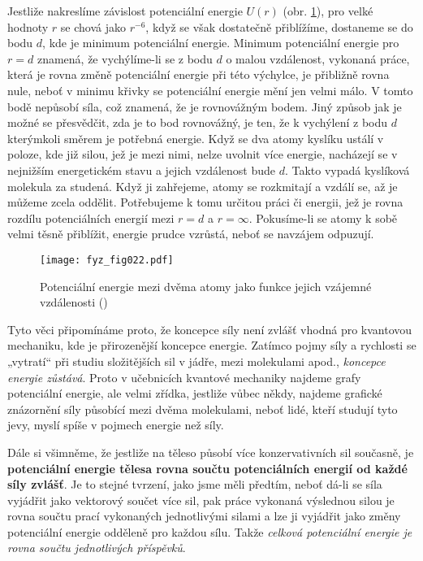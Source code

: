     Jestliže nakreslíme závislost potenciální energie \(U(r)\) (obr. \ref{fyz:fig022}), pro velké 
    hodnoty \(r\) se chová jako \(r^{-6}\), když se však dostatečně přiblížíme, dostaneme se do 
    bodu \(d\), kde je minimum potenciální energie. Minimum potenciální energie pro \(r=d\) 
    znamená, že vychýlíme-li se z bodu \(d\) o malou vzdálenost, vykonaná práce, která je rovna 
    změně potenciální energie při této výchylce, je přibližně rovna nule, neboť v minimu křivky se 
    potenciální energie mění jen velmi málo. V tomto bodě nepůsobí síla, což znamená, že je 
    rovnovážným bodem. Jiný způsob jak je možné se přesvědčit, zda je to bod rovnovážný, je ten, že 
    k vychýlení z bodu \(d\) kterýmkoli směrem je potřebná energie. Když se dva atomy kyslíku 
    ustálí v poloze, kde již silou, jež je mezi nimi, nelze uvolnit více energie, nacházejí se v 
    nejnižším energetickém stavu a jejich vzdálenost bude \(d\). Takto vypadá kyslíková molekula za 
    studená. Když ji zahřejeme, atomy se rozkmitají a vzdálí se, až je můžeme zcela oddělit. 
    Potřebujeme k tomu určitou práci či energii, jež je rovna rozdílu potenciálních energií mezi 
    \(r = d\) a \(r=\infty\). Pokusíme-li se atomy k sobě velmi těsně přiblížit, energie prudce 
    vzrůstá, neboť se navzájem odpuzují.    
    
    \begin{figure}[ht!]  %
      \centering
      \texttt{[image: fyz\_fig022.pdf]}
      \caption{Potenciální energie mezi dvěma atomy jako funkce jejich vzájemné vzdálenosti 
               (\cite[s.~202]{Feynman01})}
      \label{fyz:fig022}
    \end{figure}
    Tyto věci připomínáme proto, že koncepce síly není zvlášť vhodná pro kvantovou mechaniku, kde 
    je přirozenější koncepce energie. Zatímco pojmy síly a rychlosti se „vytratí“ při studiu 
    složitějších sil v jádře, mezi molekulami apod., \emph{koncepce energie zůstává}. Proto v 
    učebnicích kvantové mechaniky najdeme grafy potenciální energie, ale velmi zřídka, jestliže 
    vůbec někdy, najdeme grafické znázornění síly působící mezi dvěma molekulami, neboť lidé, kteří 
    studují tyto jevy, myslí spíše v pojmech energie než síly.
    
    Dále si všimněme, že jestliže na těleso působí více konzervativních sil současně, je 
    \textbf{potenciální energie tělesa rovna součtu potenciálních energií od každé síly zvlášť}. Je 
    to stejné tvrzení, jako jsme měli předtím, neboť dá-li se síla vyjádřit jako vektorový součet 
    více sil, pak práce vykonaná výslednou silou je rovna součtu prací vykonaných jednotlivými 
    silami a lze ji vyjádřit jako změny potenciální energie odděleně pro každou sílu. Takže 
    \emph{celková potenciální energie je rovna součtu jednotlivých příspěvků}.
    
